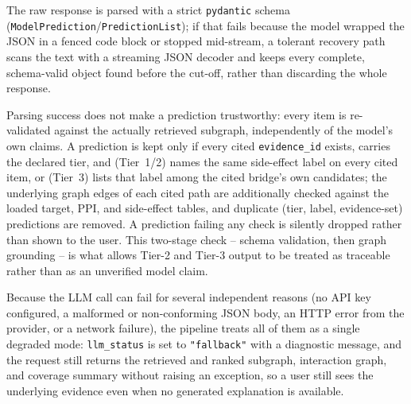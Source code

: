 The raw response is parsed with a strict \texttt{pydantic} schema
(\texttt{ModelPrediction}/\texttt{PredictionList}); if that fails because
the model wrapped the JSON in a fenced code block or stopped mid-stream, a
tolerant recovery path scans the text with a streaming JSON decoder and
keeps every complete, schema-valid object found before the cut-off, rather
than discarding the whole response.

Parsing success does not make a prediction trustworthy: every item is
re-validated against the actually retrieved subgraph, independently of the
model's own claims. A prediction is kept only if every cited
\texttt{evidence\_id} exists, carries the declared tier, and (Tier~1/2)
names the same side-effect label on every cited item, or (Tier~3) lists
that label among the cited bridge's own candidates; the underlying graph
edges of each cited path are additionally checked against the loaded
target, PPI, and side-effect tables, and duplicate
(tier, label, evidence-set) predictions are removed. A prediction failing
any check is silently dropped rather than shown to the user. This two-stage
check -- schema validation, then graph grounding -- is what allows Tier-2
and Tier-3 output to be treated as traceable rather than as an unverified
model claim.

Because the LLM call can fail for several independent reasons (no API key
configured, a malformed or non-conforming JSON body, an HTTP error from the
provider, or a network failure), the pipeline treats all of them as a
single degraded mode: \texttt{llm\_status} is set to \texttt{"fallback"}
with a diagnostic message, and the request still returns the retrieved and
ranked subgraph, interaction graph, and coverage summary without raising an
exception, so a user still sees the underlying evidence even when no
generated explanation is available.
